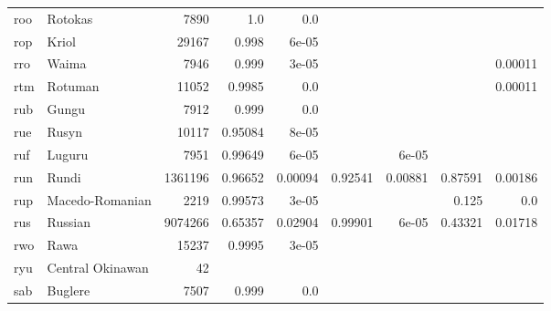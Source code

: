 \documentclass[11pt]{article}
\begin{document}
\begin{table*}[h]
{\begin{tabular}{llrrrrrrr}
roo         & Rotokas         & 7890         & 1.0         & 0.0         &          &          &          &          \\

rop         & Kriol         & 29167         & 0.998         & 6e-05         &          &          &          &          \\

rro         & Waima         & 7946         & 0.999         & 3e-05         &          &          &          & 0.00011         \\

rtm         & Rotuman         & 11052         & 0.9985         & 0.0         &          &          &          & 0.00011         \\

rub         & Gungu         & 7912         & 0.999         & 0.0         &          &          &          &          \\

rue         & Rusyn         & 10117         & 0.95084         & 8e-05         &          &          &          &          \\

ruf         & Luguru         & 7951         & 0.99649         & 6e-05         &          & 6e-05         &          &          \\

run         & Rundi         & 1361196         & 0.96652         & 0.00094         & 0.92541         & 0.00881         & 0.87591         & 0.00186         \\

rup         & Macedo-Romanian         & 2219         & 0.99573         & 3e-05         &          &          & 0.125         & 0.0         \\

rus         & Russian         & 9074266         & 0.65357         & 0.02904         & 0.99901         & 6e-05         & 0.43321         & 0.01718         \\

rwo         & Rawa         & 15237         & 0.9995         & 3e-05         &          &          &          &          \\

ryu         & Central Okinawan         & 42         &          &          &          &          &          &          \\

sab         & Buglere         & 7507         & 0.999         & 0.0         &          &          &          &          \\


\end{tabular}}
\end{table*}
\end{document}
